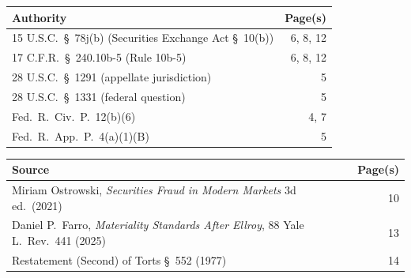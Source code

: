 \documentclass[12pt]{article}
\begin{document}
\vspace{12pt}

\begin{tcolorbox}[legalbox, title={Statutes \& Regulations}]

\begin{tabularx}{\linewidth}{@{} X r @{}}
  \toprule
  \rowcolor{NavyDeep!8}
  \textbf{\color{NavyDeep} Authority} & \textbf{\color{NavyDeep} Page(s)} \\
  \midrule
  15 U.S.C.\ \S\ 78j(b) (Securities Exchange Act \S\ 10(b)) & 6, 8, 12 \\[3pt]
  \rowcolor{NavyDeep!4}
  17 C.F.R.\ \S\ 240.10b-5 (Rule 10b-5) & 6, 8, 12 \\[3pt]
  28 U.S.C.\ \S\ 1291 (appellate jurisdiction) & 5 \\[3pt]
  \rowcolor{NavyDeep!4}
  28 U.S.C.\ \S\ 1331 (federal question) & 5 \\[3pt]
  Fed.\ R.\ Civ.\ P.\ 12(b)(6) & 4, 7 \\[3pt]
  \rowcolor{NavyDeep!4}
  Fed.\ R.\ App.\ P.\ 4(a)(1)(B) & 5 \\[3pt]
  \bottomrule
\end{tabularx}

\end{tcolorbox}

\vspace{12pt}

\begin{tcolorbox}[legalbox, title={Secondary Authorities}]

\begin{tabularx}{\linewidth}{@{} X r @{}}
  \toprule
  \rowcolor{NavyDeep!8}
  \textbf{\color{NavyDeep} Source} & \textbf{\color{NavyDeep} Page(s)} \\
  \midrule
  Miriam Ostrowski, \textit{Securities Fraud in Modern Markets} 3d ed.\ (2021) & 10 \\[3pt]
  \rowcolor{NavyDeep!4}
  Daniel P.\ Farro, \textit{Materiality Standards After Ellroy}, 88 Yale L.\ Rev.\ 441 (2025) & 13 \\[3pt]
  Restatement (Second) of Torts \S\ 552 (1977) & 14 \\[3pt]
  \bottomrule
\end{tabularx}

\end{tcolorbox}

\clearpage
\end{document}
